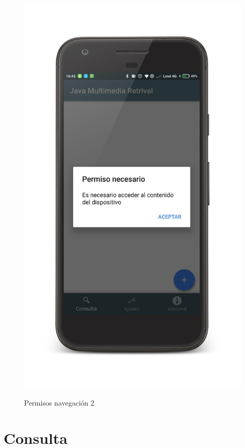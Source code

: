 \begin{figure}[H] %
\centering
\includegraphics[scale=0.15]{imagenes/permisos2.png}  %
\label{permisos2.png}
\caption{Permisos navegación 2}
\end{figure}

\section{Consulta}

